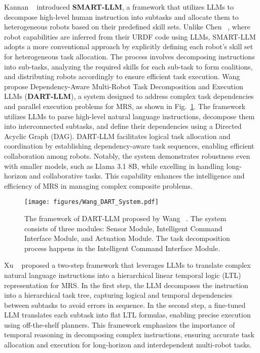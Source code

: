 Kannan \etal~\cite{kannan_smart-llm_2024} introduced \textbf{SMART-LLM}, a framework that utilizes LLMs to decompose high-level human instruction into subtasks and allocate them to heterogeneous robots based on their predefined skill sets. Unlike Chen \etal~\cite{chen_emos_2024}, where robot capabilities are inferred from their URDF code using LLMs, SMART-LLM adopts a more conventional approach by explicitly defining each robot's skill set for heterogeneous task allocation. The process involves decomposing instructions into sub-tasks, analyzing the required skills for each sub-task to form coalitions, and distributing robots accordingly to ensure efficient task execution.
Wang \etal~\cite{wang_dart-llm_2024} propose Dependency-Aware Multi-Robot Task Decomposition and Execution LLMs (\textbf{DART-LLM}), a system designed to address complex task dependencies and parallel execution problems for MRS, as shown in Fig.~\ref{fig:dart-llm}. The framework utilizes LLMs to parse high-level natural language instructions, decompose them into interconnected subtasks, and define their dependencies using a Directed Acyclic Graph (DAG). DART-LLM facilitates logical task allocation and coordination by establishing dependency-aware task sequences, enabling efficient collaboration among robots. Notably, the system demonstrates robustness even with smaller models, such as Llama 3.1 8B, while excelling in handling long-horizon and collaborative tasks. This capability enhances the intelligence and efficiency of MRS in managing complex composite problems. 
\begin{figure}[ht]
    \centering
    \texttt{[image: figures/Wang\_DART\_System.pdf]}
    \caption{The framework of DART-LLM proposed by Wang \etal~\cite{wang_dart-llm_2024}. The system consists of three modules: Sensor Module, Intelligent Command Interface Module, and Actuation Module. The task decomposition process happens in the Intelligent Command Interface Module.}
    \label{fig:dart-llm}
\end{figure}
Xu \etal~\cite{xu_scaling_2024} proposed a two-step framework that leverages LLMs to translate complex natural language instructions into a hierarchical linear temporal logic (LTL) representation for MRS. In the first step, the LLM decomposes the instruction into a hierarchical task tree, capturing logical and temporal dependencies between subtasks to avoid errors in sequence. In the second step, a fine-tuned LLM translates each subtask into flat LTL formulas, enabling precise execution using off-the-shelf planners. This framework emphasizes the importance of temporal reasoning in decomposing complex instructions, ensuring accurate task allocation and execution for long-horizon and interdependent multi-robot tasks.
